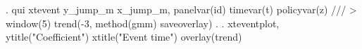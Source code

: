 . qui xtevent y_jump_m x_jump_m, panelvar(id) timevar(t) policyvar(z) ///
>    window(5) trend(-3, method(gmm) saveoverlay) 
{\smallskip}
. 
. xteventplot, ytitle("Coefficient") xtitle("Event time") overlay(trend)

